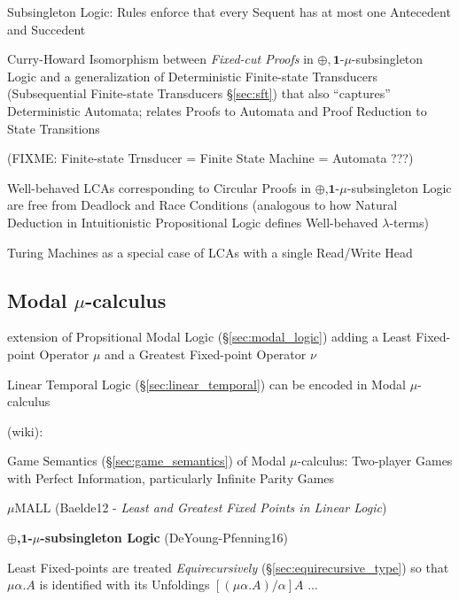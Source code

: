 Subsingleton Logic: Rules enforce that every Sequent has at most one
Antecedent and Succedent

Curry-Howard Isomorphism between \emph{Fixed-cut Proofs} in
$\oplus,\mathbf{1}$-$\mu$-subsingleton Logic and a generalization of
Deterministic Finite-state Transducers (Subsequential Finite-state
Transducers \S\ref{sec:sft}) that also ``captures'' Deterministic
Automata; relates Proofs to Automata and Proof Reduction to State
Transitions

(FIXME: Finite-state Trnsducer = Finite State Machine = Automata ???)

Well-behaved LCAs corresponding to Circular Proofs in
$\oplus$,$\mathbf{1}$-$\mu$-subsingleton Logic are free from Deadlock
and Race Conditions (analogous to how Natural Deduction in
Intuitionistic Propositional Logic defines Well-behaved
$\lambda$-terms)

Turing Machines as a special case of LCAs with a single Read/Write
Head


\asterism


\subsection{Modal $\mu$-calculus}\label{sec:modal_mu_logic}

extension of Propsitional Modal Logic (\S\ref{sec:modal_logic}) adding
a Least Fixed-point Operator $\mu$ and a Greatest Fixed-point Operator
$\nu$

\fist Linear Temporal Logic (\S\ref{sec:linear_temporal}) can be
encoded in Modal $\mu$-calculus

(wiki):

Game Semantics (\S\ref{sec:game_semantics}) of Modal $\mu$-calculus:
Two-player Games with Perfect Information, particularly Infinite
Parity Games

\asterism

$\mu$MALL (Baelde12 - \emph{Least and Greatest Fixed Points in Linear
  Logic})

\asterism

\textbf{$\oplus$,$\mathbf{1}$-$\mu$-subsingleton Logic}
(DeYoung-Pfenning16)

Least Fixed-points are treated \emph{Equirecursively}
(\S\ref{sec:equirecursive_type}) so that $\mu\alpha.A$ is identified
with its Unfoldings $[(\mu\alpha.A)/\alpha]A$ ...

